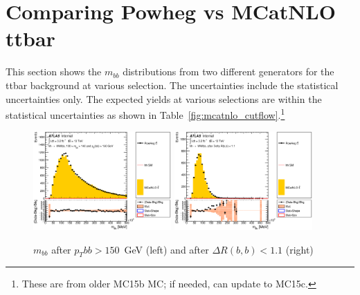 \section {Comparing Powheg vs MCatNLO ttbar}
This section shows the $m_{bb}$ distributions from two different generators for the ttbar background at various selection. The uncertainties include the statistical uncertainties only. The expected yields at various selections are within the statistical uncertainties as shown in Table~\ref{fig:mcatnlo_cutflow}.\footnote{These are from older MC15b MC; if needed, can update to MC15c.} 

\begin{figure}[!h]
\begin{center}
\includegraphics*[width=0.47\textwidth] {figures/MCatNLO/C_opt700_bbpt150_bbMass.eps}
\includegraphics*[width=0.47\textwidth] {figures/MCatNLO/C_opt700_bbpt150_drbb11_bbMass.eps}
\caption[$m_{bb}$ after $p_T{bb} > 150$~GeV (left) and after $\Delta R(b,b) < 1.1$ (right)]{$m_{bb}$ after $p_T{bb} > 150$~GeV (left) and after $\Delta R(b,b) < 1.1$ (right)}
\end{center}
\end{figure}

